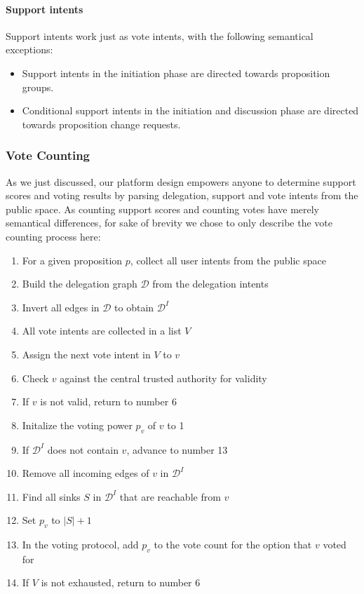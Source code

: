 \paragraph{Support intents}
Support intents work just as vote intents, with the following semantical exceptions:
\begin{itemize}
  \item Support intents in the initiation phase are directed towards proposition groups. 
  \item Conditional support intents in the initiation and discussion phase are directed towards proposition change requests.
\end{itemize}






\subsubsection{Vote Counting}
\label{ssec:Vote_Counting}
As we just discussed, our platform design empowers anyone to determine support scores and voting results by parsing delegation, support and vote intents from the public space.
As counting support scores and counting votes have merely semantical differences, for sake of brevity we chose to only describe the vote counting process here:

\begin{enumerate}
  \item For a given proposition $p$, collect all user intents from the public space
  \item Build the delegation graph $\mathcal{D}$ from the delegation intents
  \item Invert all edges in $\mathcal{D}$ to obtain $\mathcal{D}^I$
  \item All vote intents are collected in a list $V$
  \item Assign the next vote intent in $V$ to $v$
  \item Check $v$ against the central trusted authority for validity 
  \item If $v$ is not valid, return to number 6
  \item Initalize the voting power $p_v$ of $v$ to 1
  \item If $\mathcal{D}^I$ does not contain $v$, advance to number 13
  \item Remove all incoming edges of $v$ in $\mathcal{D}^I$
  \item Find all sinks $S$ in $\mathcal{D}^I$ that are reachable from $v$
  \item Set $p_v$ to $|S|+1$
  \item In the voting protocol, add $p_v$ to the vote count for the option that $v$ voted for
  \item If $V$ is not exhausted, return to number 6
\end{enumerate}


